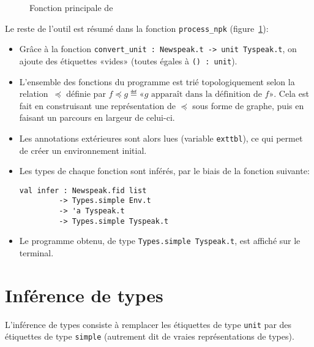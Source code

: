 \begin{figure}
\caption{Fonction principale de \ptrtype{}}
\label{fig:implem-process}
\end{figure}

Le reste de l'outil est résumé dans la fonction
\texttt{process\_npk} (figure~\ref{fig:implem-process}):

\begin{itemize}

\item Grâce à la fonction \verb!convert_unit : Newspeak.t -> unit Tyspeak.t!,
  on ajoute des étiquettes «vides» (toutes égales à \verb!() : unit!).

\item L'ensemble des fonctions du programme est trié topologiquement selon la
  relation~$\preceq$ définie par $f \preceq g \eqdef \textrm{«} g
  \textrm{ apparaît dans la définition de } f \textrm{»}$. Cela est fait en
  construisant une représentation de $\preceq$ sous forme de graphe, puis en
  faisant un parcours en largeur de celui-ci.


\item Les annotations extérieures sont alors lues (variable \texttt{exttbl}), ce
  qui permet de créer un environnement initial.

\item Les types de chaque fonction sont inférés, par le biais de la fonction
  suivante:

\begin{Verbatim}
val infer : Newspeak.fid list
         -> Types.simple Env.t
         -> 'a Tyspeak.t
         -> Types.simple Tyspeak.t
\end{Verbatim}

\item Le programme obtenu, de type \texttt{Types.simple Tyspeak.t}, est affiché
  sur le terminal.

\end{itemize}

\section{Inférence de types}

L'inférence de types consiste à remplacer les étiquettes de type \texttt{unit}
par des étiquettes de type \texttt{simple} (autrement dit de vraies
représentations de types).

